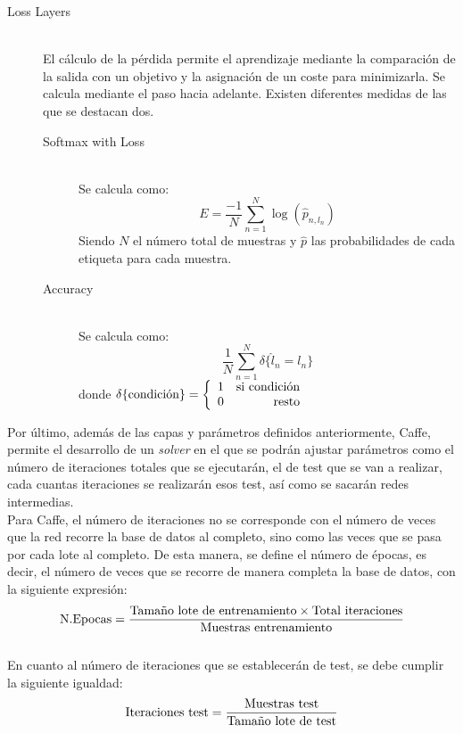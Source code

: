 \begin{description}
\vspace{50pt}
\item[Loss Layers] \hfill 
\vspace{10pt}
\\
	El cálculo de la pérdida permite el aprendizaje mediante la comparación de la salida con un objetivo y la asignación de un coste para minimizarla. Se calcula mediante el paso hacia adelante. Existen diferentes medidas de las que se destacan dos.
	\vspace{10pt}
	\begin{description}
	\item[Softmax with Loss] \hfill 
	\vspace{5pt}
	\\
		Se calcula como: 
		$$E = \frac{-1}{N} \sum\limits_{n=1}^N \log(\hat{p}_{n,l_n})$$
		Siendo $N$ el número total de muestras y $\hat{p}$ las probabilidades de cada etiqueta para cada muestra.
		\vspace{10pt}
	\item[Accuracy] \hfill 
	\vspace{5pt}
	\\
		Se calcula como:
		$$\frac{1}{N} \sum\limits_{n=1}^N \delta\{ \hat{l}_n = l_n \}$$
		donde $\delta\{ \textup{condición}\} = \left\{ \begin{array}{lr} 1 &  \textup{si condición} \\ 0 & \mbox{resto} \end{array} \right.$
	\end{description}
	
\end{description}
\vspace{20pt}
Por último, además de las capas y parámetros definidos anteriormente, Caffe, permite el desarrollo de un \textit{solver} en el que se podrán ajustar parámetros como el número de iteraciones totales que se ejecutarán, el de test que se van a realizar, cada cuantas iteraciones se realizarán esos test, así como se sacarán redes intermedias.\\
Para Caffe, el número de iteraciones no se corresponde con el número de veces que la red recorre la base de datos al completo, sino como las veces que se pasa por cada lote al completo. De esta manera, se define el número de épocas, es decir, el número de veces que se recorre de manera completa la base de datos, con la siguiente expresión:\\
$$\textup{N.Epocas}=\frac{\textup{Tamaño lote de entrenamiento}\times \textup{Total iteraciones}}{\textup{Muestras entrenamiento}} $$\\
En cuanto al número de iteraciones que se establecerán de test, se debe cumplir la siguiente igualdad:
$$\textup{Iteraciones test}=\frac{\textup{Muestras test}}{\textup{Tamaño lote de test}}$$

